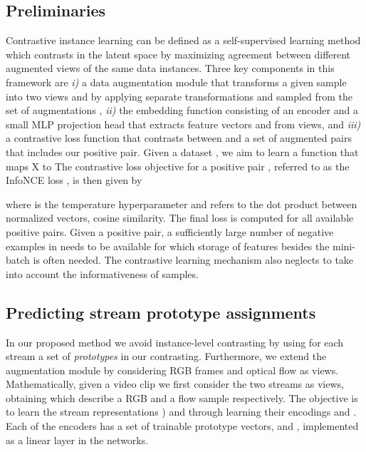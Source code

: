 \documentclass[10pt,twocolumn,letterpaper]{article}
\begin{document}
\subsection{Preliminaries}
\label{sec:preliminaries} 
Contrastive instance learning \cite{he_momentum_2020, chen_simple_2020} can be defined as a self-supervised learning method which contrasts in the latent space by maximizing agreement between different augmented views of the same data instances. Three key components in this framework are \textit{i)} a data augmentation module that transforms a given sample  into two views  and  by applying separate transformations  and  sampled from the set of augmentations , \textit{ii)} the embedding function  consisting of an encoder and a small MLP projection head that extracts feature vectors  and  from views, and \textit{iii)} a contrastive loss function that contrasts between  and a set  of augmented pairs that includes our positive pair. Given a dataset , we aim to learn a function  that maps X to  The contrastive loss objective for a positive pair , referred to as the InfoNCE loss \cite{sohn_improved_2016, oord_representation_2019, chen_simple_2020}, is then given by 

where  is the temperature hyperparameter and    refers to the dot product between normalized vectors, \ie cosine similarity. The final loss is computed for all available positive pairs. Given a positive pair, a sufficiently large number of negative examples in  needs to be available for which storage of features besides the mini-batch is often needed. The contrastive learning mechanism also neglects to take into account the informativeness of samples.

\subsection{Predicting stream prototype assignments}
\label{sec:predict}
In our proposed method we avoid instance-level contrasting by using for each stream a set of \textit{prototypes} in our contrasting. Furthermore, we extend the augmentation module by considering RGB frames and optical flow as views. Mathematically, given a video clip  we first consider the two streams as views, obtaining  which describe a RGB and a flow sample respectively. The objective is to learn the stream representations ) and  through learning their encodings  and . Each of the encoders has a set of  trainable prototype vectors,    and   , implemented as a linear layer in the networks. 
\end{document}
